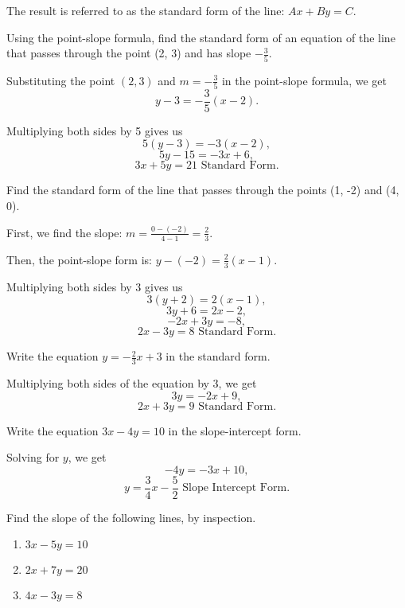 The result is referred to as the standard form of the line: $Ax + By = C$.

\begin{example}
Using the point-slope formula, find the standard form of an equation of the line that passes through the point (2, 3) and has slope $-\frac{3}{5}$.
\end{example}

\begin{solution}
Substituting the point $(2, 3)$ and $m = -\frac{3}{5}$ in the point-slope formula, we get
\[y - 3 = -\frac{3}{5}(x - 2).\]

Multiplying both sides by 5 gives us
\[5(y - 3) = -3(x - 2),\]
\[5y - 15 = -3x + 6,\]
\[3x + 5y = 21 \text{ Standard Form}.\]
\end{solution}


\begin{example}
Find the standard form of the line that passes through the points (1, -2) and (4, 0).
\end{example}

\begin{solution}
First, we find the slope: $m = \frac{0 - (-2)}{4 - 1} = \frac{2}{3}.$

Then, the point-slope form is: $y - (-2) = \frac{2}{3}(x - 1).$

Multiplying both sides by 3 gives us
\[3(y + 2) = 2(x - 1),\]
\[3y + 6 = 2x - 2,\]
\[-2x + 3y = -8,\]
\[2x - 3y = 8 \text{ Standard Form}.\]
\end{solution}


\begin{example}
Write the equation $y = -\frac{2}{3}x + 3$ in the standard form.
\end{example}

\begin{solution}
Multiplying both sides of the equation by 3, we get
\[3y = -2x + 9,\]
\[2x + 3y = 9 \text{ Standard Form}.\]
\end{solution}


\begin{example}
Write the equation $3x - 4y = 10$ in the slope-intercept form.
\end{example}

\begin{solution}
Solving for $y$, we get
\[-4y = -3x + 10,\]
\[y = \frac{3}{4}x - \frac{5}{2} \text{ Slope Intercept Form}.\]
\end{solution}

\begin{example}
Find the slope of the following lines, by inspection.
\begin{enumerate}
    \item $3x - 5y = 10$
    \item $2x + 7y = 20$
    \item $4x - 3y = 8$
\end{enumerate}
\end{example}

